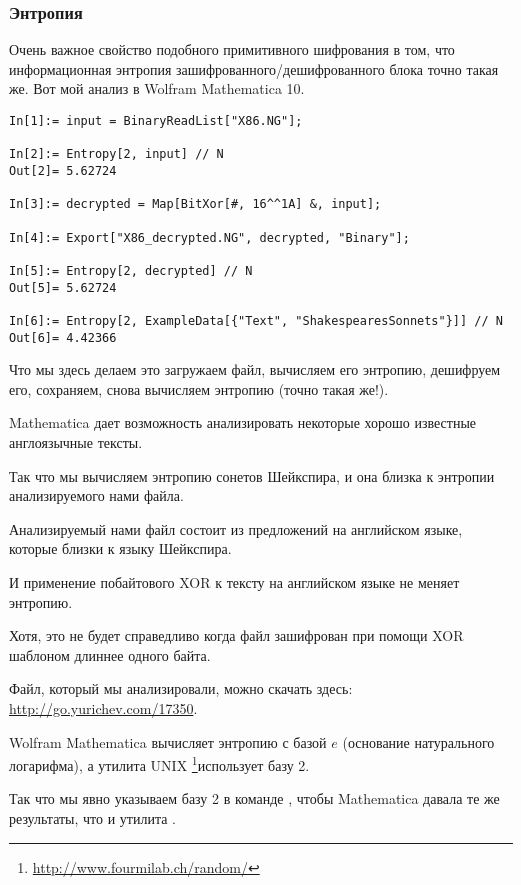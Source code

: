 \subsubsection{Энтропия}

Очень важное свойство подобного примитивного шифрования в том, что информационная энтропия
зашифрованного/дешифрованного блока точно такая же.
Вот мой анализ в Wolfram Mathematica 10.

\begin{lstlisting}[caption=Wolfram Mathematica 10]
In[1]:= input = BinaryReadList["X86.NG"];

In[2]:= Entropy[2, input] // N
Out[2]= 5.62724

In[3]:= decrypted = Map[BitXor[#, 16^^1A] &, input];

In[4]:= Export["X86_decrypted.NG", decrypted, "Binary"];

In[5]:= Entropy[2, decrypted] // N
Out[5]= 5.62724

In[6]:= Entropy[2, ExampleData[{"Text", "ShakespearesSonnets"}]] // N
Out[6]= 4.42366
\end{lstlisting}

Что мы здесь делаем это загружаем файл, вычисляем его энтропию, дешифруем его, сохраняем, снова вычисляем энтропию (точно такая же!).

Mathematica дает возможность анализировать некоторые хорошо известные англоязычные тексты.

Так что мы вычисляем энтропию сонетов Шейкспира, и она близка к энтропии анализируемого нами файла.

Анализируемый нами файл состоит из предложений на английском языке, которые близки к языку
Шейкспира.

И применение побайтового XOR к тексту на английском языке не меняет энтропию.


Хотя, это не будет справедливо когда файл зашифрован при помощи XOR шаблоном длиннее одного байта.

Файл, который мы анализировали, можно скачать здесь: \url{http://go.yurichev.com/17350}.


\newcommand{\FNENTURL}{\footnote{\url{http://www.fourmilab.ch/random/}}}

Wolfram Mathematica вычисляет энтропию с базой $e$ (основание натурального логарифма),
а утилита UNIX \FNENTURL использует базу 2.

Так что мы явно указываем базу 2 в команде , чтобы Mathematica давала те же результаты, что и утилита .
